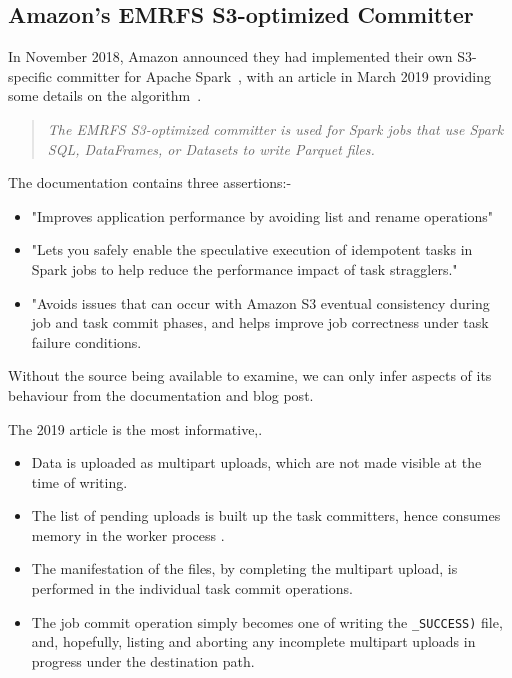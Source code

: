 \documentclass[conference]{IEEEtran}
\begin{document}
\subsection{Amazon's EMRFS S3-optimized Committer}
\label{subsec:emrfs-committer}

In November 2018, Amazon announced they had implemented their own S3-specific
committer for Apache Spark\ \cite{AWS-EMR-committer}, with an article
in March 2019 providing some details on the algorithm\ \cite{AWS-EMR-committer-blog}.

\begin{quote}
\emph{
The EMRFS S3-optimized committer is used for Spark jobs that use Spark SQL,
DataFrames, or Datasets to write Parquet files.}
\end{quote}

The documentation contains three assertions:-

\begin{itemize}
  \item "Improves application performance by avoiding list and rename operations"
  \item "Lets you safely enable the speculative execution of idempotent tasks in Spark jobs to help reduce the performance impact of task stragglers."
  \item "Avoids issues that can occur with Amazon S3 eventual consistency during job and task commit phases, and helps improve job correctness under task failure conditions.
\end{itemize}


Without the source being available to examine, we can only infer aspects
of its behaviour from the documentation and blog post.

The 2019 article is the most informative,.

\begin{itemize}
  \item Data is uploaded as multipart uploads, which are not made visible at the time of writing.
  \item The list of pending uploads is built up the task committers, hence consumes memory in the worker process \cite{AWS-EMR-committer-tuning}.
  \item The manifestation of the files, by completing the multipart upload, is performed in the individual task commit operations.
  \item The job commit operation simply becomes one of writing the \texttt{_SUCCESS)} file, and, hopefully, listing and aborting any incomplete
  multipart uploads in progress under the destination path.

\end{itemize}
\end{document}
